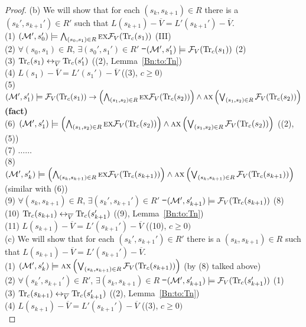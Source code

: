 \documentclass[letterpaper]{article} %
\begin{document}
\begin{proof}
        (b) We will show that for each $(s_k, s_{k+1}) \in R$ there is a $(s_k', s_{k+1}') \in R'$ such that $L(s_{k+1}) - \overline V = L'(s_{k+1}') - \overline V$.\\
        (1) $({\cal M}', s_0') \models \bigwedge_{(s_0, s_1) \in R} \textsc{e} \textsc{x} {\cal F}_V(\textrm{Tr}_c(s_1))$  \hfill  (III)\\
        (2) $\forall (s_0, s_1) \in R$, $\exists (s_0', s_1') \in R'$ \st\ $({\cal M}', s_1') \models {\cal F}_V(\textrm{Tr}_c(s_1))$  \hfill  (2)\\
        (3) $\textrm{Tr}_c(s_1) \leftrightarrow_{\overline V} \textrm{Tr}_c(s_1')$  \hfill  ((2), Lemma~\ref{Bn:to:Tn}) \\
        (4) $L(s_1) - \overline V = L'(s_1') - \overline V$  \hfill   ((3), $c \geq 0)$\\
        (5) $({\cal M}', s_1') \models {\cal F}_V(\textrm{Tr}_c(s_1)) \rightarrow \left(\bigwedge_{(s_1,s_2)\in R} \textsc{e} \textsc{x} {\cal F}_V(\textrm{Tr}_c(s_2))\right) \wedge \textsc{a} \textsc{x} \left(\bigvee_{(s_1,s_2)\in R} {\cal F}_V(\textrm{Tr}_c(s_2))\right)$     \hfill  \textbf{(fact)}\\
        (6) $({\cal M}', s_1') \models \left(\bigwedge_{(s_1,s_2)\in R} \textsc{e} \textsc{x} {\cal F}_V(\textrm{Tr}_c(s_2))\right) \wedge \textsc{a} \textsc{x} \left(\bigvee_{(s_1,s_2)\in R} {\cal F}_V(\textrm{Tr}_c(s_2))\right)$ \hfill ((2), (5))\\
        (7) $\dots \dots$ \\
        (8) $({\cal M}', s_k') \models \left(\bigwedge_{(s_k,s_{k+1})\in R} \textsc{e} \textsc{x} {\cal F}_V(\textrm{Tr}_c(s_{k+1}))\right) \wedge \textsc{a} \textsc{x} \left(\bigvee_{(s_k,s_{k+1})\in R} {\cal F}_V(\textrm{Tr}_c(s_{k+1}))\right)$       \hfill (similar with (6))\\
        (9) $\forall (s_k, s_{k+1}) \in R$, $\exists (s_k', s_{k+1}') \in R'$ \st\ $({\cal M}', s_{k+1}') \models {\cal F}_V(\textrm{Tr}_c(s_{k+1}))$  \hfill  (8)\\
        (10) $\textrm{Tr}_c(s_{k+1}) \leftrightarrow_{\overline V} \textrm{Tr}_c(s_{k+1}')$    \hfill ((9), Lemma~\ref{Bn:to:Tn}) \\
        (11) $L(s_{k+1}) - \overline V = L'(s_{k+1}') - \overline V$  \hfill   ((10), $c \geq 0)$\\

        (c) We will show that for each $(s_k', s_{k+1}') \in R'$ there is a $(s_k, s_{k+1})\in R$ such that $L(s_{k+1}) - \overline V = L'(s_{k+1}') - \overline V$.\\
        (1) $({\cal M}', s_k') \models \textsc{a} \textsc{x} \left(\bigvee_{(s_k,s_{k+1})\in R} {\cal F}_V(\textrm{Tr}_c(s_{k+1}))\right)$  \hfill (by (8) talked above)\\
        (2) $\forall (s_k', s_{k+1}') \in R'$, $\exists (s_k, s_{k+1}) \in R$ \st\ $({\cal M}', s_{k+1}') \models {\cal F}_V(\textrm{Tr}_c(s_{k+1}'))$  \hfill (1) \\
        (3) $\textrm{Tr}_c(s_{k+1}) \leftrightarrow_{\overline V} \textrm{Tr}_c(s_{k+1}')$    \hfill ((2), Lemma~\ref{Bn:to:Tn}) \\
        (4) $L(s_{k+1}) - \overline V = L'(s_{k+1}') - \overline V$  \hfill   ((3), $c \geq 0)$\\


\end{proof}
\end{document}
